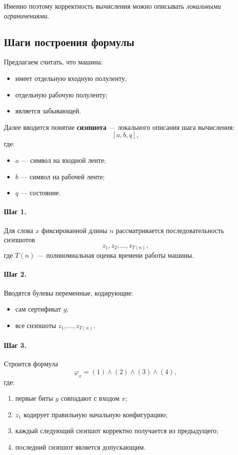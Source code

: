 \documentclass[12pt,a4paper]{article}
\theoremstyle{definition}
\theoremstyle{plain}
\begin{document}
Именно поэтому корректность вычисления можно описывать \emph{локальными ограничениями}.

\subsection{Шаги построения формулы}
Предлагаем считать, что машина:
\begin{itemize}
\item имеет отдельную входную полуленту;
\item отдельную рабочую полуленту;
\item является забывающей.
\end{itemize}

Далее вводится понятие \textbf{снэпшота} --- локального описания шага вычисления:
\[
[a,b,q],
\]
где:
\begin{itemize}
\item $a$ --- символ на входной ленте;
\item $b$ --- символ на рабочей ленте;
\item $q$ --- состояние.
\end{itemize}

\paragraph{Шаг 1.}
Для слова $x$ фиксированной длины $n$ рассматривается последовательность снэпшотов
\[
z_1,z_2,\dots,z_{T(n)},
\]
где $T(n)$ --- полиномиальная оценка времени работы машины.

\paragraph{Шаг 2.}
Вводятся булевы переменные, кодирующие:
\begin{itemize}
\item сам сертификат $y$;
\item все снэпшоты $z_1,\dots,z_{T(n)}$.
\end{itemize}

\paragraph{Шаг 3.}
Строится формула
\[
\varphi_x=(1)\wedge(2)\wedge(3)\wedge(4),
\]
где:
\begin{enumerate}
\item первые биты $y$ совпадают с входом $x$;
\item $z_1$ кодирует правильную начальную конфигурацию;
\item каждый следующий снэпшот корректно получается из предыдущего;
\item последний снэпшот является допускающим.
\end{enumerate}
\end{document}
